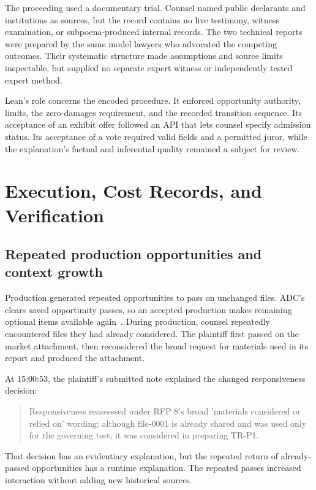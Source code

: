 The proceeding used a documentary trial.  Counsel named public declarants and institutions as sources, but the record contains no live testimony, witness examination, or subpoena-produced internal records.  The two technical reports were prepared by the same model lawyers who advocated the competing outcomes.  Their systematic structure made assumptions and source limits inspectable, but supplied no separate expert witness or independently tested expert method.

Lean's role concerns the encoded procedure.  It enforced opportunity authority, limits, the zero-damages requirement, and the recorded transition sequence.  Its acceptance of an exhibit offer followed an API that lets counsel specify admission status.  Its acceptance of a vote required valid fields and a permitted juror, while the explanation's factual and inferential quality remained a subject for review.

\section{Execution, Cost Records, and Verification}

\subsection{Repeated production opportunities and context growth}

Production generated repeated opportunities to pass on unchanged files.  ADC's  clears saved opportunity passes, so an accepted production makes remaining optional items available again~\cite[ and ]{adccore}.  During production, counsel repeatedly encountered files they had already considered.  The plaintiff first passed on the market attachment, then reconsidered the broad request for materials used in its report and produced the attachment.

At 15:00:53, the plaintiff's submitted note explained the changed responsiveness decision:
\begin{quote}
Responsiveness reassessed under RFP 8's broad 'materials considered or relied on' wording: although file-0001 is already shared and was used only for the governing test, it was considered in preparing TR-P1.
\end{quote}
That decision has an evidentiary explanation, but the repeated return of already-passed opportunities has a runtime explanation.  The repeated passes increased interaction without adding new historical sources.

